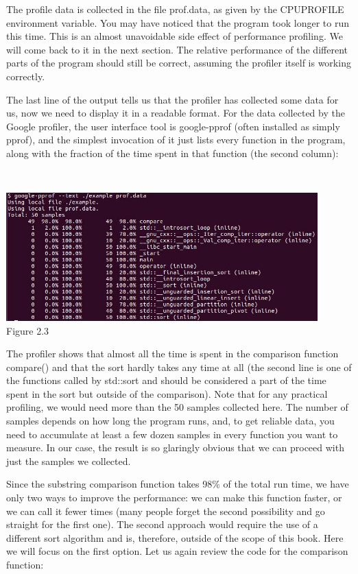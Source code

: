 The profile data is collected in the file prof.data, as given by the CPUPROFILE environment variable. You may have noticed that the program took longer to run this time. This is an almost unavoidable side effect of performance profiling. We will come back to it in the next section. The relative performance of the different parts of the program should still be correct, assuming the profiler itself is working correctly.

The last line of the output tells us that the profiler has collected some data for us, now we need to display it in a readable format. For the data collected by the Google profiler, the user interface tool is google-pprof (often installed as simply pprof), and the simplest invocation of it just lists every function in the program, along with the fraction of the time spent in that function (the second column):

\hspace*{\fill} \\ %
\begin{center}
\includegraphics[width=0.9\textwidth]{content/1/chapter2/images/3.jpg}\\
Figure 2.3
\end{center}

The profiler shows that almost all the time is spent in the comparison function compare() and that the sort hardly takes any time at all (the second line is one of the functions called by std::sort and should be considered a part of the time spent in the sort but outside of the comparison). Note that for any practical profiling, we would need more than the 50 samples collected here. The number of samples depends on how long the program runs, and, to get reliable data, you need to accumulate at least a few dozen samples in every function you want to measure. In our case, the result is so glaringly obvious that we can proceed with just the samples we collected.

Since the substring comparison function takes 98\% of the total run time, we have only two ways to improve the performance: we can make this function faster, or we can call it fewer times (many people forget the second possibility and go straight for the first one). The second approach would require the use of a different sort algorithm and is, therefore, outside of the scope of this book. Here we will focus on the first option. Let us again review the code for the comparison function:

